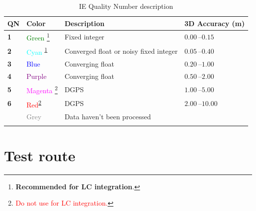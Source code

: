 \documentclass[11pt,fleqn]{book} %
\begin{document}
\begin{table}[!htb]
\centering{}%
\begin{minipage}[t]{1\columnwidth}%
\begin{center}
\begin{tabular}{>{\centering}p{2cm}>{\centering}p{3cm}>{\centering}p{6cm}>{\centering}p{3cm}}
 \rowcolor{lightgray}\textbf{QN} & \textbf{Color} & \textbf{Description} & \textbf{3D Accuracy (m) }\tabularnewline
\midrule
\textbf{1} & \textcolor{green}{Green}%
\footnote{\textbf{Recommended for LC integration}.\label{fn:Suggested-accuracy-QT}%
} & Fixed integer & $\SIrange[range-phrase=\,-\,]{0.00}{0.15}{}$\tabularnewline
\textbf{2} & \textcolor{cyan}{Cyan} \textsuperscript{\ref{fn:Suggested-accuracy-QT}} & Converged float or noisy fixed integer & $\SIrange[range-phrase=\,-\,]{0.05}{0.40}{}$\tabularnewline
\midrule
\textbf{3} & \textcolor{blue}{Blue} & Converging float & $\SIrange[range-phrase=\,-\,]{0.20}{1.00}{}$\tabularnewline
\textbf{4} & \textcolor{purple}{Purple} & Converging float & $\SIrange[range-phrase=\,-\,]{0.50}{2.00}{}$\tabularnewline
\midrule
\textbf{5} & \textcolor{magenta}{Magenta}%
\footnote{\textcolor{red}{Do not use for LC integration.}\label{fn:Not-recommended-LC}%
} & DGPS & $\SIrange[range-phrase=\,-\,]{1.00}{5.00}{}$\tabularnewline
\textbf{6} & \textcolor{red}{Red}\textsuperscript{\ref{fn:Not-recommended-LC}} & DGPS & $\SIrange[range-phrase=\,-\,]{2.00}{10.00}{}$\tabularnewline
\midrule
 & \textcolor{gray}{Grey} & Data haven't been processed & \tabularnewline
 \endrule
\end{tabular}\caption{IE Quality Number description\label{tab:Quality-Number-description}}
\par\end{center}%
\end{minipage}
\end{table}



\section{Test route}
\end{document}
